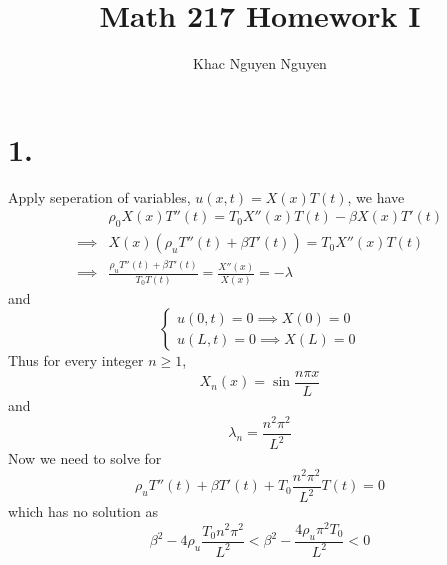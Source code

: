 \documentclass[11pt]{article}
\title{\textbf{Math 217 Homework I}}
\author{Khac Nguyen Nguyen}
\date{}
\theoremstyle{mystyle}
\theoremstyle{definition}
\begin{document}
\section*{1.}
Apply seperation of variables, $u(x,t) = X(x) T(t)$, we have 
\begin{align*}
  &\rho_0 X(x) T''(t) = T_0 X''(x)T(t) - \beta X(x)T'(t) \\ 
  \implies & X(x) (\rho_u T''(t) + \beta T'(t)) = T_0 X''(x)T(t) \\
  \implies & \displaystyle\frac{\rho_u T''(t) + \beta T'(t)}{T_0 T(t)} = \displaystyle\frac{X''(x)}{X(x)} = - \lambda
\end{align*}
and 
\[
  \begin{cases}
    u(0,t) = 0 \implies X(0) = 0 \\
    u(L,t) = 0 \implies X(L) = 0
  \end{cases}
\]
Thus for every integer $n\ge 1$,  
\[
  X_n(x) = \sin \displaystyle\frac{n\pi x}{L}
\]
and 
\[
  \lambda_n = \displaystyle\frac{n^2\pi^2}{L^2}
\]
Now we need to solve for 
\[
  \rho_u T''(t) + \beta T'(t) + T_0 \displaystyle\frac{n^2 \pi^2}{L^2} T(t) = 0
\]
which has no solution as 
\[
 \beta^2 - 4 \rho_u \displaystyle\frac{T_0 n^2 \pi^2}{L^2} < \beta^2 -\displaystyle\frac{4 \rho_u \pi^2 T_0}{L^2} < 0 
\]
\newpage
\end{document}
